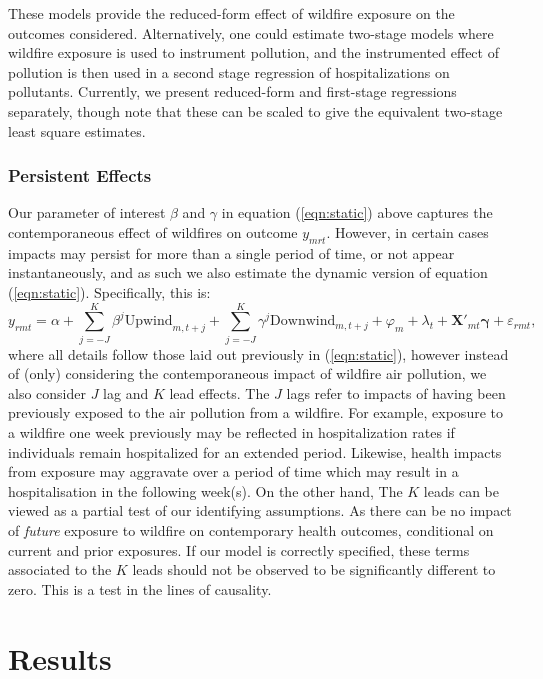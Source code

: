 \documentclass[11pt]{article}
\begin{document}
\begin{spacing}{1.5}
These models provide the reduced-form effect of wildfire exposure on the outcomes considered.  Alternatively, one could estimate two-stage models where wildfire exposure is used to instrument pollution, and the instrumented effect of pollution is then used in a second stage regression of hospitalizations on pollutants.  Currently, we present reduced-form and first-stage regressions separately, though note that these can be scaled to give the equivalent two-stage least square estimates.


\subsubsection{Persistent Effects}
\label{sscn:comunatime_p}
Our parameter of interest $\beta$ and $\gamma$ in equation (\ref{eqn:static}) above captures the contemporaneous effect of wildfires on outcome $y_{mrt}$.  However, in certain cases impacts may persist for more than a single period of time, or not appear instantaneously, and as such we also estimate the dynamic version of equation (\ref{eqn:static}).  Specifically, this is:
\begin{equation}
\label{eq:dynamic}
y_{rmt}=\alpha + \sum_{j=-J}^K\beta^{j}\text{Upwind}_{m,t+j} + \sum_{j=-J}^K\gamma^{j}\text{Downwind}_{m,t+j} + \varphi_m + \lambda_t + \bm{X}'_{mt}\bm{\gamma} + \varepsilon_{rmt},
\end{equation}
where all  details follow those laid out previously in (\ref{eqn:static}), however instead of (only) considering the contemporaneous impact of wildfire air pollution, we also consider $J$ lag and $K$ lead effects.  The $J$ lags refer to impacts of having been previously exposed to the air pollution from a wildfire. For example, exposure to a wildfire one week previously may be reflected in hospitalization rates if individuals remain hospitalized for an extended period. Likewise, health impacts from exposure may aggravate over a period of time which may result in a hospitalisation in the following week(s). On the other hand, The $K$ leads can be viewed as a partial test of our identifying assumptions. As there can be no impact of \emph{future} exposure to wildfire on contemporary health outcomes, conditional on current and prior exposures. If our model is correctly specified, these terms associated to the $K$ leads should not be observed to be significantly different to zero. This is a test in the lines of \citet{Granger1969} causality. 



\section{Results}
\label{scn:results}


\end{spacing}
\end{document}
